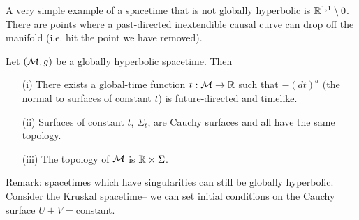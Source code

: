 \begin{exm}
    A very simple example of a spacetime that is not globally hyperbolic is $\mathbb{R}^{1,1}\setminus{0}$. There are points where a past-directed inextendible causal curve can drop off the manifold (i.e. hit the point we have removed).
\end{exm}
\begin{thm}[Wald]
    Let $(\mathcal{M},g)$ be a globally hyperbolic spacetime. Then
    \begin{enumerate}
        \item[(i)] There exists a global-time function $t:\mathcal{M} \to \mathbb{R}$ such that $-(dt)^a$ (the normal to surfaces of constant $t$) is future-directed and timelike.
        \item[(ii)] Surfaces of constant $t$, $\Sigma_t$, are Cauchy surfaces and all have the same topology.
        \item[(iii)] The topology of $\mathcal{M}$ is $\mathbb{R}\times \Sigma$.
    \end{enumerate}
\end{thm}
Remark: spacetimes which have singularities can still be globally hyperbolic. Consider the Kruskal spacetime-- we can set initial conditions on the Cauchy surface $U+V={}$constant.

